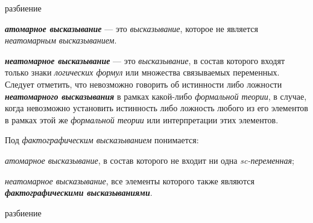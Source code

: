 \begin{SCn}
\begin{scnrelfromset}{разбиение}
\end{scnrelfromset}
\end{SCn}

\textbf{\textit{атомарное высказывание}} --- это \textit{высказывание}, которое не является \textit{неатомарным высказыванием}.

\textbf{\textit{неатомарное высказывание}} --- это \textit{высказывание}, в состав которого входят только знаки \textit{логических формул} или множества связываемых переменных. Следует отметить, что невозможно говорить об истинности либо ложности \textbf{\textit{неатомарного высказывания}} в рамках какой-либо \textit{формальной теории}, в случае, когда невозможно установить истинность либо ложность любого из его элементов в рамках этой же \textit{формальной теории} или интерпретации этих элементов.

Под \textit{фактографическим высказыванием} понимается:
\begin{textitemize}
	\item \textit{атомарное высказывание}, в состав которого не входит ни одна \textit{sc-переменная};
	\item \textit{неатомарное высказывание}, все элементы которого также являются \textbf{\textit{фактографическими высказываниями}}.
\end{textitemize}

\begin{SCn}
\begin{scnrelfromset}{разбиение}
\end{scnrelfromset}
\end{SCn}


